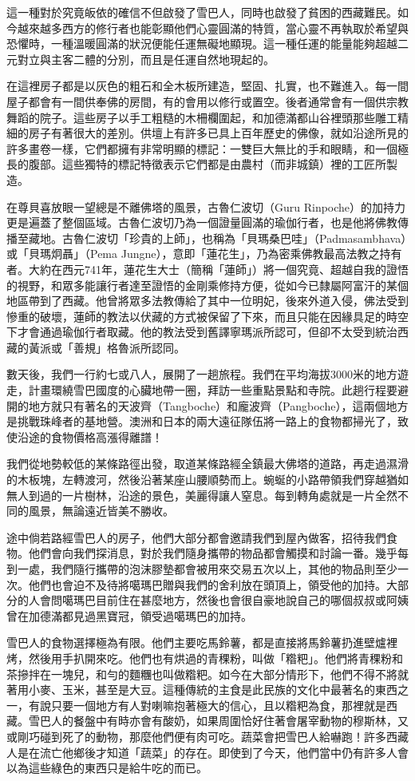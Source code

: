 這一種對於究竟皈依的確信不但啟發了雪巴人，同時也啟發了貧困的西藏難民。如今越來越多西方的修行者也能彰顯他們心靈圓滿的特質，當心靈不再執取於希望與恐懼時，一種溫暖圓滿的狀況便能任運無礙地顯現。這一種任運的能量能夠超越二元對立與主客二體的分別，而且是任運自然地現起的。

在這裡房子都是以灰色的粗石和全木板所建造，堅固、扎實，也不難進入。每一間屋子都會有一間供奉佛的房間，有的會用以修行或置空。後者通常會有一個供宗教舞蹈的院子。這些房子以手工粗糙的木柵欄圍起，和加德滿都山谷裡頭那些雕工精細的房子有著很大的差別。供壇上有許多已具上百年歷史的佛像，就如沿途所見的許多畫卷一樣，它們都擁有非常明顯的標記：一雙巨大無比的手和眼睛，和一個極長的腹部。這些獨特的標記特徵表示它們都是由農村（而非城鎮）裡的工匠所製造。

在尊貝喜放眼一望總是不離佛塔的風景，古魯仁波切（Guru
Rinpoche）的加持力更是遍蓋了整個區域。古魯仁波切乃為一個證量圓滿的瑜伽行者，也是他將佛教傳播至藏地。古魯仁波切「珍貴的上師」，也稱為「貝瑪桑巴哇」（Padmasambhava）或「貝瑪炯聶」（Pema
Jungne），意即「蓮花生」，乃為密乘佛教最高法教之持有者。大約在西元741年，蓮花生大士（簡稱「蓮師」）將一個究竟、超越自我的證悟的視野，和眾多能讓行者達至證悟的金剛乘修持方便，從如今已隸屬阿富汗的某個地區帶到了西藏。他曾將眾多法教傳給了其中一位明妃，後來外道入侵，佛法受到慘重的破壞，蓮師的教法以伏藏的方式被保留了下來，而且只能在因緣具足的時空下才會通過瑜伽行者取藏。他的教法受到舊譯寧瑪派所認可，但卻不太受到統治西藏的黃派或「善規」格魯派所認同。

數天後，我們一行約七或八人，展開了一趟旅程。我們在平均海拔3000米的地方遊走，計畫環繞雪巴國度的心臟地帶一圈，拜訪一些重點景點和寺院。此趟行程要避開的地方就只有著名的天波齊（Tangboche）和龐波齊（Pangboche），這兩個地方是挑戰珠峰者的基地營。澳洲和日本的兩大遠征隊伍將一路上的食物都掃光了，致使沿途的食物價格高漲得離譜！

我們從地勢較低的某條路徑出發，取道某條路經全鎮最大佛塔的道路，再走過濕滑的木板塊，左轉渡河，然後沿著某座山腰順勢而上。蜿蜒的小路帶領我們穿越猶如無人到過的一片樹林，沿途的景色，美麗得讓人窒息。每到轉角處就是一片全然不同的風景，無論遠近皆美不勝收。

途中倘若路經雪巴人的房子，他們大部分都會邀請我們到屋內做客，招待我們食物。他們會向我們探消息，對於我們隨身攜帶的物品都會觸摸和討論一番。幾乎每到一處，我們隨行攜帶的泡沫膠墊都會被用來交易五次以上，其他的物品則至少一次。他們也會迫不及待將噶瑪巴贈與我們的舍利放在頭頂上，領受他的加持。大部分的人會問噶瑪巴目前住在甚麼地方，然後也會很自豪地說自己的哪個叔叔或阿姨曾在加德滿都見過黑寶冠，領受過噶瑪巴的加持。

雪巴人的食物選擇極為有限。他們主要吃馬鈴薯，都是直接將馬鈴薯扔進壁爐裡烤，然後用手扒開來吃。他們也有烘過的青稞粉，叫做「糌粑」。他們將青稞粉和茶摻拌在一塊兒，和勻的麵糰也叫做糌粑。如今在大部分情形下，他們不得不將就著用小麥、玉米，甚至是大豆。這種傳統的主食是此民族的文化中最著名的東西之一，有說只要一個地方有人對喇嘛抱著極大的信心，且以糌粑為食，那裡就是西藏。雪巴人的餐盤中有時亦會有酸奶，如果周圍恰好住著會屠宰動物的穆斯林，又或剛巧碰到死了的動物，那麼他們便有肉可吃。蔬菜會把雪巴人給嚇跑！許多西藏人是在流亡他鄉後才知道「蔬菜」的存在。即使到了今天，他們當中仍有許多人會以為這些綠色的東西只是給牛吃的而已。

